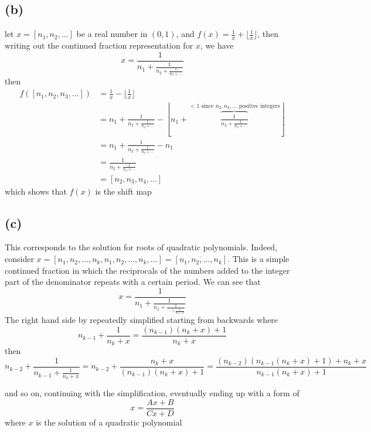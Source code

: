 \documentclass[12pt]{article}
\begin{document}
\subsection*{(b)}
let $x = [n_1,n_2,\ldots]$ be a real number in $(0,1)$, and $f(x) = \frac{1}{x} + \lfloor \frac{1}{x} \rfloor$, then writing out the continued fraction representation for $x$, we have
$$ 
x = \frac{1}{n_1 + \frac{1}{n_2 + \frac{1}{n_3 + \ldots}}}
$$
then 
\begin{align*}
	f([n_1,n_2,n_3,\ldots]) &= \frac{1}{x} - \lfloor \frac{1}{x} \rfloor \\
	&= n_1 + \frac{1}{n_2 + \frac{1}{n_3 + \ldots}} - \left \lfloor n_1 +\overbrace{\frac{1}{n_2 + \frac{1}{n_3 + \ldots}}}^{<1 \text{ since $n_2,n_3,\ldots$ positive integers}}\right \rfloor \\
	&= n_1 + \frac{1}{n_2 + \frac{1}{n_3 + \ldots}} - n_1 \\
	&= \frac{1}{n_2 + \frac{1}{n_3 + \ldots}}  \\
	&= [n_2,n_3,n_4,\ldots]
\end{align*}
which shows that $f(x)$ is the shift map 

\subsection*{(c)}
This corresponds to the solution for roots of quadratic polynomials. Indeed, consider $x = [n_1,n_2,\ldots,n_k,n_1,n_2,\ldots,n_k,\ldots] = [\overline{n_1,n_2,\ldots,n_k}]$. This is a simple continued fraction in which the reciprocals of the numbers added to the integer part of the denominator repeats with a certain period. We can see that 
$$
x = \frac{1}{n_1 + \frac{1}{n_2 + \frac{1}{\ddots +\frac{1}{n_k + x}}}}
$$
The right hand side by repeatedly simplified starting from backwards where 
$$ 
n_{k-1} + \frac{1}{n_k+x} = \frac{(n_{k-1})(n_k + x) + 1}{n_k + x}
$$ 
then 
$$ n_{k-2} + \frac{1}{n_{k-1} + \frac{1}{n_k+x} } =  n_{k-2} +  \frac{n_k + x}{(n_{k-1})(n_k + x) + 1} = \frac{(n_{k-2})(n_{k-1}(n_k + x) + 1) + n_k + x }{n_{k-1}(n_{k} + x) + 1}
$$

and so on, continuing with the simplification, eventually ending up with a form of 
$$
x = \frac{Ax + B}{Cx+D}
$$
where $x$ is the solution of a quadratic polynomial

\pagebreak
\end{document}
